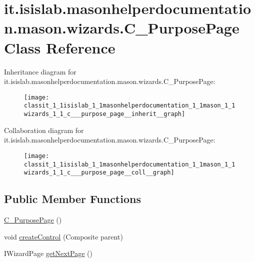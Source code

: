 \hypertarget{classit_1_1isislab_1_1masonhelperdocumentation_1_1mason_1_1wizards_1_1_c___purpose_page}{\section{it.\-isislab.\-masonhelperdocumentation.\-mason.\-wizards.\-C\-\_\-\-Purpose\-Page Class Reference}
\label{classit_1_1isislab_1_1masonhelperdocumentation_1_1mason_1_1wizards_1_1_c___purpose_page}
}


Inheritance diagram for it.\-isislab.\-masonhelperdocumentation.\-mason.\-wizards.\-C\-\_\-\-Purpose\-Page\-:
\nopagebreak
\begin{figure}[H]
\begin{center}
\leavevmode
\texttt{[image: classit\_1\_1isislab\_1\_1masonhelperdocumentation\_1\_1mason\_1\_1wizards\_1\_1\_c\_\_\_purpose\_page\_\_inherit\_\_graph]}
\end{center}
\end{figure}


Collaboration diagram for it.\-isislab.\-masonhelperdocumentation.\-mason.\-wizards.\-C\-\_\-\-Purpose\-Page\-:
\nopagebreak
\begin{figure}[H]
\begin{center}
\leavevmode
\texttt{[image: classit\_1\_1isislab\_1\_1masonhelperdocumentation\_1\_1mason\_1\_1wizards\_1\_1\_c\_\_\_purpose\_page\_\_coll\_\_graph]}
\end{center}
\end{figure}
\subsection*{Public Member Functions}
\begin{DoxyCompactItemize}
\item 
\hyperlink{classit_1_1isislab_1_1masonhelperdocumentation_1_1mason_1_1wizards_1_1_c___purpose_page_a1c03f292ba0afb1b2be5dd26f8cd3035}{C\-\_\-\-Purpose\-Page} ()
\item 
void \hyperlink{classit_1_1isislab_1_1masonhelperdocumentation_1_1mason_1_1wizards_1_1_c___purpose_page_a735f845063e27f169ea0481efe337aa7}{create\-Control} (Composite parent)
\item 
I\-Wizard\-Page \hyperlink{classit_1_1isislab_1_1masonhelperdocumentation_1_1mason_1_1wizards_1_1_c___purpose_page_ab720ad0f2b4d6f2276b8cc4deaa83d0d}{get\-Next\-Page} ()
\end{DoxyCompactItemize}
